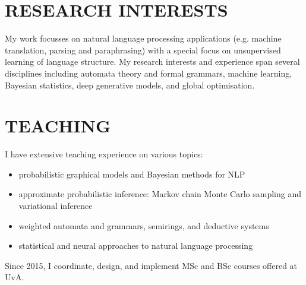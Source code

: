 \section*{RESEARCH INTERESTS}

My work focusses on natural language processing applications (e.g. machine translation, parsing and paraphrasing) with a special focus on unsupervised learning of language structure. 
My research interests and experience span several disciplines including automata theory and formal grammars, machine learning,  Bayesian statistics, deep generative models, and global optimisation.

\section*{TEACHING}

I have extensive teaching experience on various topics:
\begin{itemize}
	\item probabilistic graphical models and Bayesian methods for NLP
	\item approximate probabilistic inference: Markov chain Monte Carlo sampling and variational inference
	\item weighted automata and grammars, semirings, and deductive systems
	\item statistical and neural approaches to natural language processing
\end{itemize}

Since 2015, I coordinate, design, and implement MSc and BSc courses offered at UvA.


~


